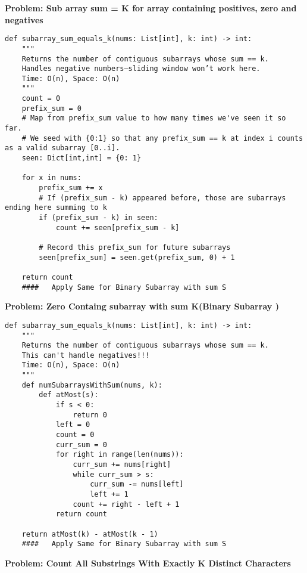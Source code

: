 \noindent\textbf{Problem: Sub array sum = K for array containing positives, zero and negatives}
\begin{verbatim}
def subarray_sum_equals_k(nums: List[int], k: int) -> int:
    """
    Returns the number of contiguous subarrays whose sum == k.
    Handles negative numbers—sliding window won’t work here.
    Time: O(n), Space: O(n)
    """
    count = 0
    prefix_sum = 0
    # Map from prefix_sum value to how many times we've seen it so far.
    # We seed with {0:1} so that any prefix_sum == k at index i counts as a valid subarray [0..i].
    seen: Dict[int,int] = {0: 1}

    for x in nums:
        prefix_sum += x
        # If (prefix_sum - k) appeared before, those are subarrays ending here summing to k
        if (prefix_sum - k) in seen:
            count += seen[prefix_sum - k]

        # Record this prefix_sum for future subarrays
        seen[prefix_sum] = seen.get(prefix_sum, 0) + 1

    return count
    ####   Apply Same for Binary Subarray with sum S
\end{verbatim}
\noindent\textbf{Problem: Zero Containg subarray with sum K(Binary Subarray ) }
\begin{verbatim}
def subarray_sum_equals_k(nums: List[int], k: int) -> int:
    """
    Returns the number of contiguous subarrays whose sum == k.
    This can't handle negatives!!!
    Time: O(n), Space: O(n)
    """
    def numSubarraysWithSum(nums, k):
        def atMost(s):
            if s < 0:
                return 0
            left = 0
            count = 0
            curr_sum = 0
            for right in range(len(nums)):
                curr_sum += nums[right]
                while curr_sum > s:
                    curr_sum -= nums[left]
                    left += 1
                count += right - left + 1
            return count

    return atMost(k) - atMost(k - 1)   
    ####   Apply Same for Binary Subarray with sum S
\end{verbatim}
\noindent\textbf{Problem: Count All Substrings With Exactly K Distinct Characters}
